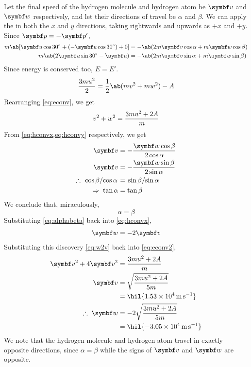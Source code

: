 Let the final speed of the hydrogen molecule and hydrogen atom be
\(\mv{v}\) and \(\mv{w}\) respectively,
and let their directions of travel be \(\alpha\) and \(\beta\).
We can apply the  in both the
\(x\) and \(y\) directions,
taking rightwards and upwards as \(+x\) and \(+y\). Since \(\mv{p}
= -\mv{p}'\),
\begin{align}
  \label{eq:hconvx}
  m\ab[\mv{u}\cos\qty{30}{\degree} + (-\mv{u}\cos\qty{30}{\degree}) +
  0] &= -\ab(2m\mv{v}\cos\alpha + m\mv{w}\cos\beta) \\
  \label{eq:hconvy}
  m\ab(2\mv{u}\sin\qty{30}{\degree}-\mv{u}) &=
  -\ab(2m\mv{v}\sin\alpha + m\mv{w}\sin\beta)
\end{align}
Since energy is conserved too, \(E = E'\).
\begin{equation}
  \f{3mu^2}{2} = \f{1}{2}\ab(mv^2 + mw^2) - A
  \label{eq:econv}
\end{equation}
Rearranging \cref{eq:econv}, we get
\begin{equation}
  v^2 + w^2 = \frac{3mu^2 + 2A}{m}
  \label{eq:econv2}
\end{equation}
From \cref{eq:hconvx,eq:hconvy} respectively, we get
\begin{align*}
  \mv{v} &= -\f{\mv{w}\cos\beta}{2\cos\alpha} \\
  \mv{v} &= -\f{\mv{w}\sin\beta}{2\sin\alpha} \\
  \therefore\; \lf{\cos\beta}{\cos\alpha} &= \lf{\sin\beta}{\sin\alpha} \\
  \Rightarrow\; \tan\alpha &= \tan\beta
\end{align*}
We conclude that, miraculously,
\begin{equation}
  \alpha = \beta
  \label{eq:alphabeta}
\end{equation}
Substituting \cref{eq:alphabeta} back into \cref{eq:hconvx},
\begin{equation}
  \mv{w} = -2\mv{v}
  \label{eq:w2v}
\end{equation}
Substituting this  discovery \cref{eq:w2v} back into
\ref{eq:econv2},
\begin{align*}
  \mv{v}^2 + 4\mv{v}^2 &= \f{3mu^2+2A}{m} \\
  \mv{v} &= \sqrt{\f{3mu^2+2A}{5m}} \\
  &= \hil{\qty{1.53e4}{\metre\per\second}}\\
  \therefore\; \mv{w} &= -2\sqrt{\f{3mu^2+2A}{5m}}\\
  &= \hil{\qty{-3.05e4}{\metre\per\second}}
\end{align*}
We note that the hydrogen molecule and hydrogen atom travel in
exactly opposite directions, since \(\alpha=\beta\) while the signs
of \(\mv{v}\) and \(\mv{w}\)
are opposite.

